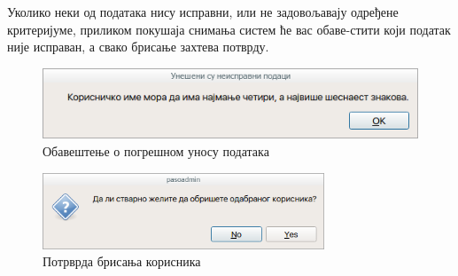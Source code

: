\documentclass[a4paper, 12pt, diplomski]{etfcyr}
\begin{document}
\begin{justify}
					Уколико неки од података нису исправни, или не задовољавају одређене критеријуме, приликом покушаја снимања систем ће вас обаве-стити који податак није исправан, а свако брисање захтева потврду.
					\begin{figure}[h]
						\begin{center}
							\includegraphics[width=1.0\textwidth]{manual/system_user_entry_error.png}
						\end{center}
						\caption{Обавештење о погрешном уносу података}
						\label{figure:system_user_entry_error}
					\end{figure}
					\begin{figure}[h]
						\begin{center}
							\includegraphics[width=0.75\textwidth]{manual/system_user_delete.png}
						\end{center}
						\caption{Потрврда брисања корисника}
						\label{figure:system_user_delete}
					\end{figure}
				\end{justify}

			\newpage
\end{document}
